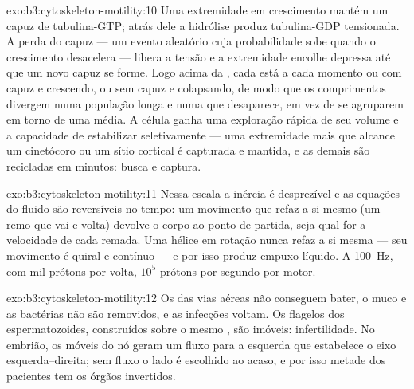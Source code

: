 \begin{solution}{exo:b3:cytoskeleton-motility:10}
Uma extremidade em crescimento mantém um capuz de tubulina-GTP; atrás
dele a hidrólise produz tubulina-GDP tensionada. A perda do capuz ---
um evento aleatório cuja probabilidade sobe quando o crescimento
desacelera --- libera a tensão e a extremidade encolhe depressa até que
um novo capuz se forme. Logo acima da , cada
 está a cada momento ou com capuz e crescendo, ou sem capuz
e colapsando, de modo que os comprimentos divergem numa população longa
e numa que desaparece, em vez de se agruparem em torno de uma média. A
célula ganha uma exploração rápida de seu volume e a capacidade de
estabilizar seletivamente --- uma extremidade mais que alcance um
cinetócoro ou um sítio cortical é capturada e mantida, e as demais são
recicladas em minutos: busca e captura.
\end{solution}

\begin{solution}{exo:b3:cytoskeleton-motility:11}
Nessa escala a inércia é desprezível e as equações do fluido são
reversíveis no tempo: um movimento que refaz a si mesmo (um remo que
vai e volta) devolve o corpo ao ponto de partida, seja qual for a
velocidade de cada remada. Uma hélice em rotação nunca refaz a si mesma
--- seu movimento é quiral e contínuo --- e por isso produz empuxo
líquido. A \qty{100}{Hz}, com mil prótons por volta, $10^{5}$ prótons
por segundo por motor.
\end{solution}

\begin{solution}{exo:b3:cytoskeleton-motility:12}
Os  das vias aéreas não conseguem bater, o muco e as bactérias
não são removidos, e as infecções voltam. Os flagelos dos
espermatozoides, construídos sobre o mesmo , são imóveis:
infertilidade. No embrião, os  móveis do nó geram um fluxo para a
esquerda que estabelece o eixo esquerda--direita; sem fluxo o lado é
escolhido ao acaso, e por isso metade dos pacientes tem os órgãos
invertidos.
\end{solution}

